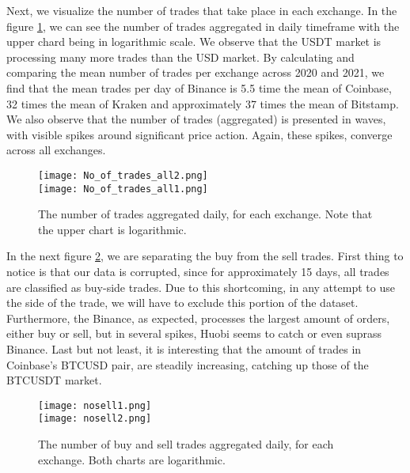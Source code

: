 Next, we visualize the number of trades that take place in each exchange. In the figure \ref{fig:nooftrades}, we can see the number of trades aggregated in daily timeframe with the upper chard being in logarithmic scale. We observe that the USDT market is processing many more trades than the USD market. By calculating and comparing the mean number of trades per exchange across 2020 and 2021, we find that the mean trades per day of Binance is 5.5 time the mean of Coinbase, 32 times the mean of Kraken and approximately 37 times the mean of Bitstamp. We also observe that the number of trades (aggregated) is presented in waves, with visible spikes around significant price action. Again, these spikes, converge across all exchanges.  

\begin{figure}[H]
	\centering
    \texttt{[image: No\_of\_trades\_all2.png]} \\
    \texttt{[image: No\_of\_trades\_all1.png]} \\ 
	\caption{The number of trades aggregated daily, for each exchange. Note that the upper chart is logarithmic.}
    \label{fig:nooftrades}
\end{figure}

In the next figure \ref{fig:nooftrades2}, we are separating the buy from the sell trades. First thing to notice is that our data is corrupted, since for approximately 15 days, all trades are classified as buy-side trades. Due to this shortcoming, in any attempt to use the side of the trade, we will have to exclude this portion of the dataset. Furthermore, the Binance, as expected, processes the largest amount of orders, either buy or sell, but in several spikes, Huobi seems to catch or even suprass Binance. Last but not least, it is interesting that the amount of trades in Coinbase's BTCUSD pair, are steadily increasing, catching up those of the BTCUSDT market.

\begin{figure}[H]
	\centering
    \texttt{[image: nosell1.png]} \\
    \texttt{[image: nosell2.png]} \\ 
	\caption{The number of buy and sell trades aggregated daily, for each exchange. Both charts are logarithmic.}
    \label{fig:nooftrades2}
\end{figure}


